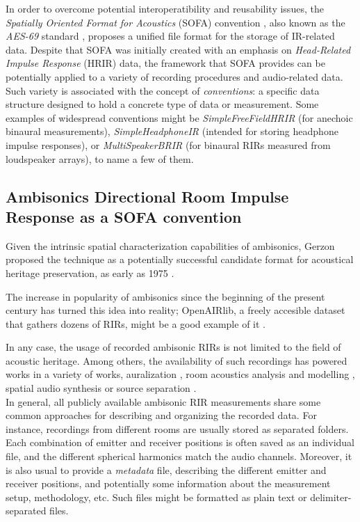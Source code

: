 In order to overcome potential interoperatibility and reusability issues, the \textit{Spatially Oriented Format for Acoustics} (SOFA) convention \cite{majdak2013spatially}, also known as the \textit{AES-69} standard \cite{majdak2015aes69}, proposes a unified file format for the storage of IR-related data. 
Despite that SOFA was initially created with an emphasis on \textit{Head-Related Impulse Response} (HRIR) data, the framework that SOFA provides can be potentially applied to a variety of recording procedures and audio-related data. 
Such variety is associated with the concept of \textit{conventions}: a specific data structure designed to hold a concrete type of data or measurement. Some examples of widespread conventions might be \textit{SimpleFreeFieldHRIR} (for anechoic binaural measurements), \textit{SimpleHeadphoneIR} (intended for storing headphone impulse responses), or \textit{MultiSpeakerBRIR} (for binaural RIRs measured from loudspeaker arrays), to name a few of them.


\subsection{Ambisonics Directional Room Impulse Response as a SOFA convention}
\label{subsec:adrir}

Given the intrinsic spatial characterization capabilities of ambisonics, Gerzon proposed the technique as a potentially successful candidate format for acoustical heritage preservation, as early as 1975 \cite{gerzon1975recording}.

The increase in popularity of ambisonics since the beginning of the present century has turned this idea into reality; OpenAIRlib, a freely accesible dataset that gathers dozens of RIRs, might be a good example of it \cite{murphy2010openair, openair}.

In any case, the usage of recorded ambisonic RIRs is not limited to the field of acoustic heritage. Among others, the availability of such recordings has powered works in a variety of works, auralization \cite{postma2016virtual}, room acoustics analysis \cite{embrechts2015measurement,clapp2011investigations} and modelling \cite{romblom2017diffuse}, spatial audio synthesis \cite{coleman2017object} or source separation \cite{baque2016separation}. \\


In general, all publicly available ambisonic RIR measurements share some common approaches for describing and organizing the recorded data. 
For instance, recordings from different rooms are usually stored as separated folders. 
Each combination of emitter and receiver positions is often saved as an individual file, and the different spherical harmonics match the audio channels.
Moreover, it is also usual to provide a \textit{metadata} file, describing the different emitter and receiver positions, and potentially some information about the measurement setup, methodology, etc. Such files might be formatted as plain text or delimiter-separated files.
 
